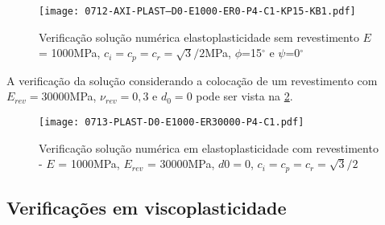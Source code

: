 \begin{figure}[H]
	\begin{center}
		\texttt{[image: 0712-AXI-PLAST--D0-E1000-ER0-P4-C1-KP15-KB1.pdf]}
	\end{center}
	\caption{\label{PLAST-D0-E1000-ER0-P4-C1-KP15-KB1}Verificação solução numérica elastoplasticidade sem revestimento $E$ = 1000MPa, $c_i=c_p=c_r = \sqrt{3}/2$MPa, $\phi$=15$^\circ$ e $\psi$=0$^\circ$}
\end{figure}

A verificação da solução considerando a colocação de um revestimento com $E_{rev} = 30000$MPa, $\nu_{rev} = 0,3$ e $d_0=0$ pode ser vista na \ref{PLAST-D0-E1000-ER30000-P4-C1}.

\begin{figure}[H]
	\begin{center}
		\texttt{[image: 0713-PLAST-D0-E1000-ER30000-P4-C1.pdf]}
	\end{center}
	\caption{\label{PLAST-D0-E1000-ER30000-P4-C1}Verificação solução numérica em elastoplasticidade com revestimento - $E$ = 1000MPa, $E_{rev}$ = 30000MPa, $d0=0$, $c_i=c_p=c_r=\sqrt{3}/2$}
\end{figure}

\subsection{Verificações em viscoplasticidade}

